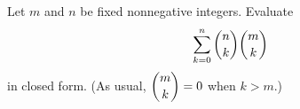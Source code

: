 Let $m$ and $n$ be fixed nonnegative integers. Evaluate
\[\sum_{k=0}^{n}\dbinom nk\dbinom mk\]
in closed form. (As usual, $\dbinom mk=0$ when $k>m$.)
